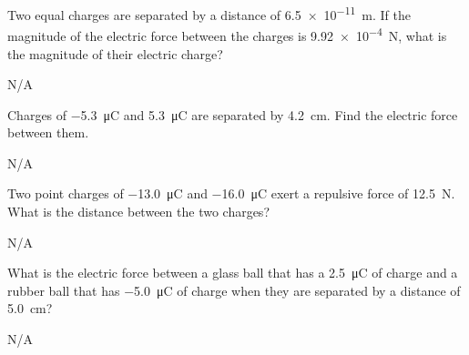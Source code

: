 \begin{question}[ID=coulomb-C-Q01,topic=coulomb,difficulty=C]
    Two equal charges are separated by a distance of
        \SI{6.5e-11}{\meter}.
    If the magnitude of the electric force between the charges
        is \SI{9.92e-4}{\newton}, what is the magnitude of
        their electric charge?
\end{question}
\begin{solution}
    N/A
\end{solution}


\begin{question}[ID=coulomb-C-Q02,topic=coulomb,difficulty=C]
    Charges of \SI{-5.3}{\micro\coulomb} and \SI{+5.3}{\micro\coulomb}
        are separated by \SI{4.2}{\centi\meter}.
    Find the electric force between them.
\end{question}
\begin{solution}
    N/A
\end{solution}


\begin{question}[ID=coulomb-C-Q03,topic=coulomb,difficulty=C]
    Two point charges of \SI{-13.0}{\micro\coulomb} and
        \SI{-16.0}{\micro\coulomb} exert a repulsive force
        of \SI{12.5}{\newton}.
    What is the distance between the two charges?
\end{question}
\begin{solution}
    N/A
\end{solution}


\begin{question}[ID=coulomb-C-Q04,topic=coulomb,difficulty=C]
    What is the electric force between a glass ball
        that has a \SI{+2.5}{\micro\coulomb} of charge
        and a rubber ball that has \SI{-5.0}{\micro\coulomb}
        of charge when they are separated by a distance of
        \SI{5.0}{\centi\meter}?
\end{question}
\begin{solution}
    N/A
\end{solution}


\endinput

